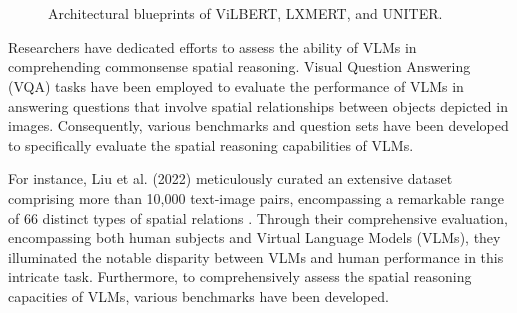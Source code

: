 \documentclass[journal,10pt]{IEEEtran}
\begin{document}
\begin{figure}[htbp]
    \centering
    \\
    \\
    \caption{Architectural blueprints of ViLBERT, LXMERT, and UNITER.}
    \label{fig:VLMs}
\end{figure}

Researchers have dedicated efforts to assess the ability of VLMs in comprehending commonsense spatial reasoning. Visual Question Answering (VQA) tasks have been employed to evaluate the performance of VLMs in answering questions that involve spatial relationships between objects depicted in images\cite{7410636}. Consequently, various benchmarks and question sets have been developed to specifically evaluate the spatial reasoning capabilities of VLMs.

For instance, Liu et al. (2022) meticulously curated an extensive dataset comprising more than 10,000 text-image pairs, encompassing a remarkable range of 66 distinct types of spatial relations \cite{liu2022visual}. Through their comprehensive evaluation, encompassing both human subjects and Virtual Language Models (VLMs), they illuminated the notable disparity between VLMs and human performance in this intricate task. Furthermore, to comprehensively assess the spatial reasoning capacities of VLMs, various benchmarks have been developed.
\end{document}
